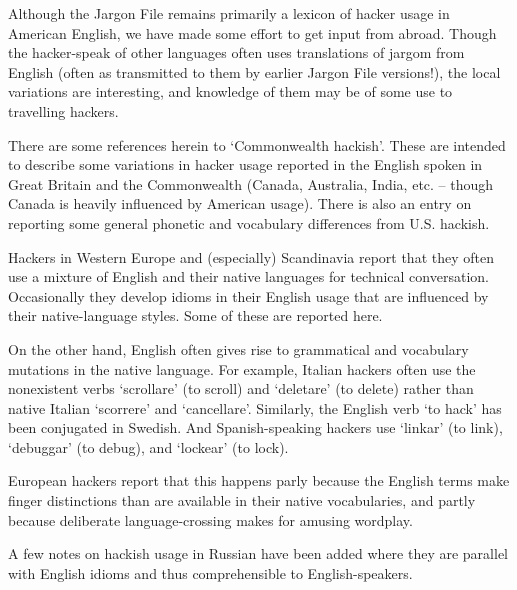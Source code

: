 Although the Jargon File remains primarily a lexicon of hacker usage in American English, we have made some effort to get input from
abroad. Though the hacker-speak of other languages often uses translations of jargom from English (often as transmitted to them by earlier
Jargon File versions!), the local variations are interesting, and knowledge of them may be of some use to travelling hackers.

There are some references herein to `Commonwealth hackish'. These are intended to describe some variations in hacker usage reported in
the English spoken in Great Britain and the Commonwealth (Canada, Australia, India, etc. -- though Canada is heavily influenced by
American usage). There is also an entry on  reporting some general phonetic and vocabulary differences from
U.S. hackish.

Hackers in Western Europe and (especially) Scandinavia report that they often use a mixture of English and their native languages for
technical conversation. Occasionally they develop idioms in their English usage that are influenced by their native-language styles. Some
of these are reported here.

On the other hand, English often gives rise to grammatical and vocabulary mutations in the native language. For example, Italian hackers
often use the nonexistent verbs `scrollare' (to scroll) and `deletare' (to delete) rather than native Italian `scorrere' and `cancellare'.
Similarly, the English verb `to hack' has been conjugated in Swedish. And Spanish-speaking hackers use `linkar' (to link), `debuggar' (to
debug), and `lockear' (to lock).

European hackers report that this happens parly because the English terms make finger distinctions than are available in their native
vocabularies, and partly because deliberate language-crossing makes for amusing wordplay.

A few notes on hackish usage in Russian have been added where they are parallel with English idioms and thus comprehensible to
English-speakers.

